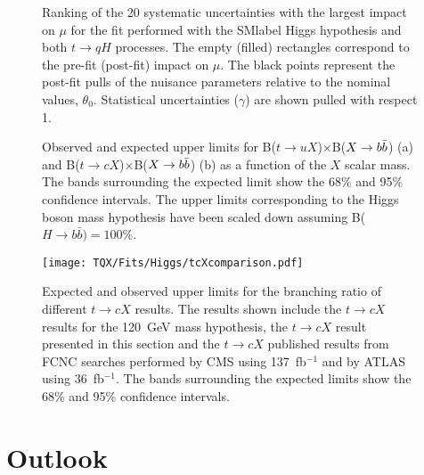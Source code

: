 \begin{figure}[htb]
    \RawFloats
    \centering
    \caption{Ranking of the 20 systematic uncertainties with the largest impact on $\mu$ for the fit performed with the \acrshort{SMlabel} Higgs hypothesis and both $t\to qH$ processes. The empty (filled) rectangles correspond  to the pre-fit (post-fit) impact on $\mu$. The black points represent the post-fit pulls of the nuisance parameters relative to the nominal values, $\theta_0$. Statistical uncertainties ($\gamma$) are shown pulled with respect 1.}
    \label{tqX:RankqH}
\end{figure}
\clearpage

\begin{figure}[htb]
    \centering
    \caption{Observed and expected upper limits for B($t\to uX$)$\times$B($X\to b\bar{b}$) (a) and B($t\to cX$)$\times$B($X\to b\bar{b}$) (b) as a function of the $X$ scalar mass. The bands surrounding the expected limit show the 68\% and 95\% confidence intervals. The upper limits corresponding to the Higgs boson mass hypothesis have been scaled down assuming B($H \rightarrow b \bar{b}) = 100\%$.}
    \label{fig:limitIncH}
\end{figure}

\begin{figure}[htb]
    \centering
    \texttt{[image: TQX/Fits/Higgs/tcXcomparison.pdf]}
    \caption{Expected and observed upper limits for the branching ratio of different $t\to cX$ results. The results shown include the $t\to cX$ results for the 120~GeV mass hypothesis, the $t\to cX$ result presented in this section and the $t\to cX$ published results from FCNC searches performed by CMS using 137~fb$^{-1}$ and by ATLAS using 36~fb$^{-1}$. The bands surrounding the expected limits show the 68\% and 95\% confidence intervals.}
    \label{fig:cHlimitcomparison}
\end{figure}

\section{Outlook}

